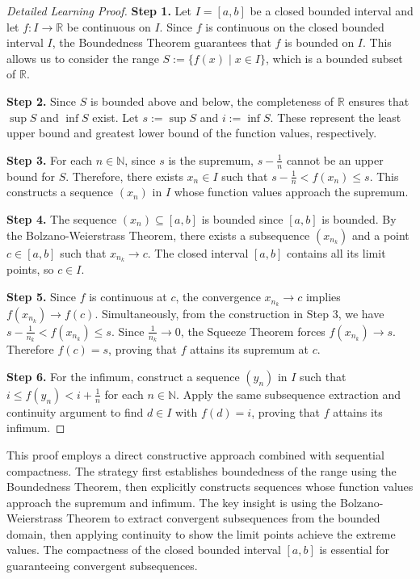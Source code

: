 \begin{proof}[Detailed Learning Proof]
\LRAProofBodyStart

\textbf{Step 1.} Let $I=[a,b]$ be a closed bounded interval and let $f : I \to \mathbb{R}$ be continuous on $I$. Since $f$ is continuous on the closed bounded interval $I$, the Boundedness Theorem guarantees that $f$ is bounded on $I$. This allows us to consider the range $S:=\{f(x)\mid x\in I\}$, which is a bounded subset of $\mathbb{R}$.

\textbf{Step 2.} Since $S$ is bounded above and below, the completeness of $\mathbb{R}$ ensures that $\sup S$ and $\inf S$ exist. Let $s := \sup S$ and $i := \inf S$. These represent the least upper bound and greatest lower bound of the function values, respectively.

\textbf{Step 3.} For each $n\in\mathbb{N}$, since $s$ is the supremum, $s-\frac{1}{n}$ cannot be an upper bound for $S$. Therefore, there exists $x_n\in I$ such that $s-\frac{1}{n}<f(x_n)\le s$. This constructs a sequence $(x_n)$ in $I$ whose function values approach the supremum.

\textbf{Step 4.} The sequence $(x_n)\subseteq[a,b]$ is bounded since $[a,b]$ is bounded. By the Bolzano-Weierstrass Theorem, there exists a subsequence $(x_{n_k})$ and a point $c\in[a,b]$ such that $x_{n_k}\to c$. The closed interval $[a,b]$ contains all its limit points, so $c\in I$.

\textbf{Step 5.} Since $f$ is continuous at $c$, the convergence $x_{n_k}\to c$ implies $f(x_{n_k})\to f(c)$. Simultaneously, from the construction in Step 3, we have $s-\frac{1}{n_k}<f(x_{n_k})\le s$. Since $\frac{1}{n_k}\to 0$, the Squeeze Theorem forces $f(x_{n_k})\to s$. Therefore $f(c)=s$, proving that $f$ attains its supremum at $c$.

\textbf{Step 6.} For the infimum, construct a sequence $(y_n)$ in $I$ such that $i\le f(y_n)<i+\frac{1}{n}$ for each $n\in\mathbb{N}$. Apply the same subsequence extraction and continuity argument to find $d\in I$ with $f(d)=i$, proving that $f$ attains its infimum.
\end{proof}

\begin{remark*}
This proof employs a direct constructive approach combined with sequential compactness. The strategy first establishes boundedness of the range using the Boundedness Theorem, then explicitly constructs sequences whose function values approach the supremum and infimum. The key insight is using the Bolzano-Weierstrass Theorem to extract convergent subsequences from the bounded domain, then applying continuity to show the limit points achieve the extreme values. The compactness of the closed bounded interval $[a,b]$ is essential for guaranteeing convergent subsequences.
\end{remark*}

